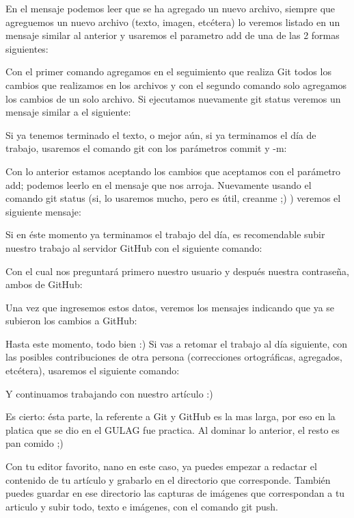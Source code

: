 \begin{multicols}{2}
En el mensaje podemos leer que se ha agregado un nuevo archivo, siempre que agreguemos un nuevo archivo (texto, imagen, etcétera) lo veremos listado en un mensaje similar al anterior y usaremos el parametro add de una de las 2 formas siguientes:\par

Con el primer comando agregamos en el seguimiento que realiza Git todos los cambios que realizamos en los archivos y con el segundo comando solo agregamos los cambios de un solo archivo. Si ejecutamos nuevamente git status veremos un mensaje similar a el siguiente:\par

Si ya tenemos terminado el texto, o mejor aún, si ya terminamos el día de trabajo, usaremos el comando git con los parámetros commit y -m:\par

Con lo anterior estamos aceptando los cambios que aceptamos con el parámetro add; podemos leerlo en el mensaje que nos arroja. Nuevamente usando el comando git status (si, lo usaremos mucho, pero es útil, creanme ;) ) veremos el siguiente mensaje:\par

Si en éste momento ya terminamos el trabajo del día, es recomendable subir nuestro trabajo al servidor GitHub con el siguiente comando:\par

Con el cual nos preguntará primero nuestro usuario y después nuestra contraseña, ambos de GitHub:\par

Una vez que ingresemos estos datos, veremos los mensajes indicando que ya se subieron los cambios a GitHub:\par

Hasta este momento, todo bien :) Si vas a retomar el trabajo al día siguiente, con las posibles contribuciones de otra persona (correcciones ortográficas, agregados, etcétera), usaremos el siguiente comando:\par

Y continuamos trabajando con nuestro artículo :)\par

Es cierto: ésta parte, la referente a Git y GitHub es la mas larga, por eso en la platica que se dio en el GULAG fue practica. Al dominar lo anterior, el resto es pan comido ;)\par

Con tu editor favorito, nano en este caso, ya puedes empezar a redactar el contenido de tu artículo y grabarlo en el directorio que corresponde. También puedes guardar en ese directorio las capturas de imágenes que correspondan a tu articulo y subir todo, texto e imágenes, con el comando git push.\par


\end{multicols}
